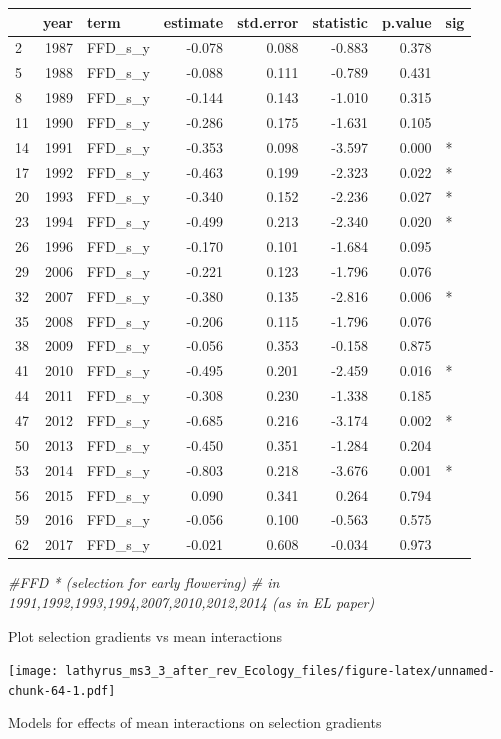 \documentclass[
]{article}
\newenvironment{Shaded}{\begin{snugshade}}{\end{snugshade}}
\newcommand{\CommentTok}[1]{\textcolor[rgb]{0.56,0.35,0.01}{\textit{#1}}}
\newcommand{\KeywordTok}[1]{\textcolor[rgb]{0.13,0.29,0.53}{\textbf{#1}}}
\newcommand{\NormalTok}[1]{#1}
\newcommand{\OperatorTok}[1]{\textcolor[rgb]{0.81,0.36,0.00}{\textbf{#1}}}
\begin{document}
\begin{longtable}[]{@{}lrlrrrrl@{}}
\toprule
& year & term & estimate & std.error & statistic & p.value &
sig\tabularnewline
\midrule
\endhead
2 & 1987 & FFD\_s\_y & -0.078 & 0.088 & -0.883 & 0.378 &\tabularnewline
5 & 1988 & FFD\_s\_y & -0.088 & 0.111 & -0.789 & 0.431 &\tabularnewline
8 & 1989 & FFD\_s\_y & -0.144 & 0.143 & -1.010 & 0.315 &\tabularnewline
11 & 1990 & FFD\_s\_y & -0.286 & 0.175 & -1.631 & 0.105 &\tabularnewline
14 & 1991 & FFD\_s\_y & -0.353 & 0.098 & -3.597 & 0.000 &
*\tabularnewline
17 & 1992 & FFD\_s\_y & -0.463 & 0.199 & -2.323 & 0.022 &
*\tabularnewline
20 & 1993 & FFD\_s\_y & -0.340 & 0.152 & -2.236 & 0.027 &
*\tabularnewline
23 & 1994 & FFD\_s\_y & -0.499 & 0.213 & -2.340 & 0.020 &
*\tabularnewline
26 & 1996 & FFD\_s\_y & -0.170 & 0.101 & -1.684 & 0.095 &\tabularnewline
29 & 2006 & FFD\_s\_y & -0.221 & 0.123 & -1.796 & 0.076 &\tabularnewline
32 & 2007 & FFD\_s\_y & -0.380 & 0.135 & -2.816 & 0.006 &
*\tabularnewline
35 & 2008 & FFD\_s\_y & -0.206 & 0.115 & -1.796 & 0.076 &\tabularnewline
38 & 2009 & FFD\_s\_y & -0.056 & 0.353 & -0.158 & 0.875 &\tabularnewline
41 & 2010 & FFD\_s\_y & -0.495 & 0.201 & -2.459 & 0.016 &
*\tabularnewline
44 & 2011 & FFD\_s\_y & -0.308 & 0.230 & -1.338 & 0.185 &\tabularnewline
47 & 2012 & FFD\_s\_y & -0.685 & 0.216 & -3.174 & 0.002 &
*\tabularnewline
50 & 2013 & FFD\_s\_y & -0.450 & 0.351 & -1.284 & 0.204 &\tabularnewline
53 & 2014 & FFD\_s\_y & -0.803 & 0.218 & -3.676 & 0.001 &
*\tabularnewline
56 & 2015 & FFD\_s\_y & 0.090 & 0.341 & 0.264 & 0.794 &\tabularnewline
59 & 2016 & FFD\_s\_y & -0.056 & 0.100 & -0.563 & 0.575 &\tabularnewline
62 & 2017 & FFD\_s\_y & -0.021 & 0.608 & -0.034 & 0.973 &\tabularnewline
\bottomrule
\end{longtable}

\begin{Shaded}
\begin{Highlighting}[]
\CommentTok{\#FFD * (selection for early flowering) }
\CommentTok{\# in 1991,1992,1993,1994,2007,2010,2012,2014 (as in EL paper)}
\end{Highlighting}
\end{Shaded}

Plot selection gradients vs mean interactions

\texttt{[image: lathyrus\_ms3\_3\_after\_rev\_Ecology\_files/figure-latex/unnamed-chunk-64-1.pdf]}

Models for effects of mean interactions on selection gradients

\begin{Shaded}
\end{Shaded}
\end{document}
